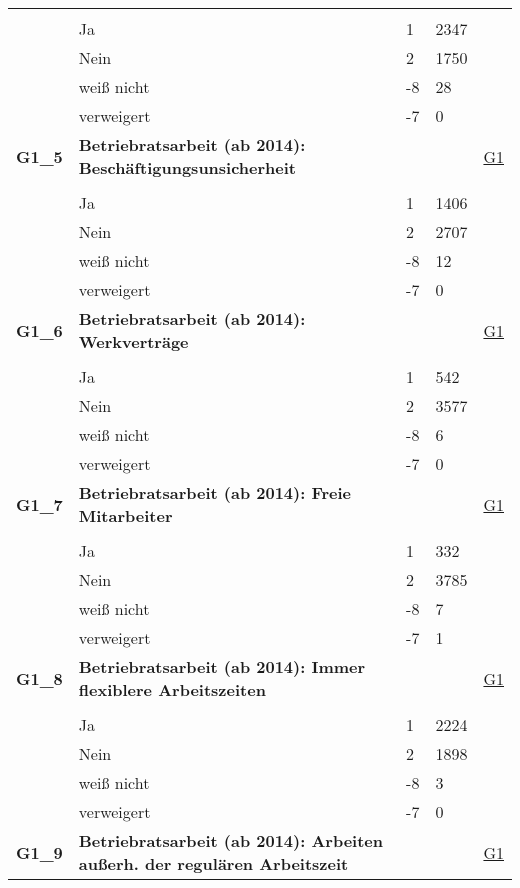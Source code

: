 \begin{longtable}{| L{2.5cm} | L{8.25cm}| C{1.5cm} | R{1.25cm} | C{2.25cm} |  }
   &  &  &  &  \\ 
   & Ja & 1 & 2347 &  \\ 
   & Nein & 2 & 1750 &  \\ 
   & weiß nicht & -8 & 28 &  \\ 
   & verweigert & -7 & 0 &  \\ 
   \midrule
\textbf{G1\_5}\label{var:suf:G1:5} & \textbf{Betriebratsarbeit (ab 2014): Beschäftigungsunsicherheit} &  &  & \hyperref[G1]{G1} \\ 
   &  &  &  &  \\ 
   & Ja & 1 & 1406 &  \\ 
   & Nein & 2 & 2707 &  \\ 
   & weiß nicht & -8 & 12 &  \\ 
   & verweigert & -7 & 0 &  \\ 
   \midrule
\textbf{G1\_6}\label{var:suf:G1:6} & \textbf{Betriebratsarbeit (ab 2014): Werkverträge} &  &  & \hyperref[G1]{G1} \\ 
   &  &  &  &  \\ 
   & Ja & 1 & 542 &  \\ 
   & Nein & 2 & 3577 &  \\ 
   & weiß nicht & -8 & 6 &  \\ 
   & verweigert & -7 & 0 &  \\ 
   \midrule
\textbf{G1\_7}\label{var:suf:G1:7} & \textbf{Betriebratsarbeit (ab 2014): Freie Mitarbeiter} &  &  & \hyperref[G1]{G1} \\ 
   &  &  &  &  \\ 
   & Ja & 1 & 332 &  \\ 
   & Nein & 2 & 3785 &  \\ 
   & weiß nicht & -8 & 7 &  \\ 
   & verweigert & -7 & 1 &  \\ 
   \midrule
\textbf{G1\_8}\label{var:suf:G1:8} & \textbf{Betriebratsarbeit (ab 2014): Immer flexiblere Arbeitszeiten} &  &  & \hyperref[G1]{G1} \\ 
   &  &  &  &  \\ 
   & Ja & 1 & 2224 &  \\ 
   & Nein & 2 & 1898 &  \\ 
   & weiß nicht & -8 & 3 &  \\ 
   & verweigert & -7 & 0 &  \\ 
   \midrule
\textbf{G1\_9}\label{var:suf:G1:9} & \textbf{Betriebratsarbeit (ab 2014): Arbeiten außerh. der regulären Arbeitszeit} &  &  & \hyperref[G1]{G1} \\ 

\end{longtable}
